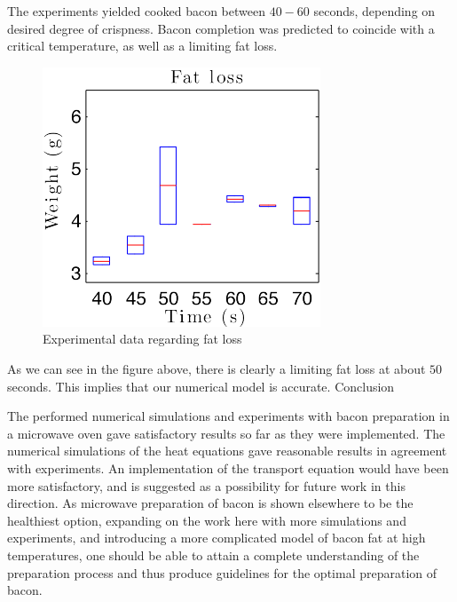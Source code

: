 \documentclass[final,hyperref={pdfpagelabels=false}]{beamer}
\begin{document}
\begin{frame}
\begin{columns}[t]
\begin{column}{.97\textwidth}
\begin{multicols}{2}
    \vspace{1.0\baselineskip}	
The experiments yielded cooked bacon between $40-60$ seconds, depending on
desired degree of crispness. Bacon completion was predicted to coincide with a
critical temperature, as well as a limiting fat loss.
\begin{figure}[!h] 
  \begin{center}
    \includegraphics[width=\linewidth]{poster_bacon.pdf}
  \end{center}
  \caption{Experimental data regarding fat loss}
  \label{fig:bacon-50sec}
\end{figure}
As we can see in the figure above, there is clearly a limiting fat loss at about
$50$ seconds. This implies that our numerical model is accurate.
\vspace{1.0\baselineskip}
{\Large Conclusion}

    The performed numerical simulations and experiments with bacon preparation
in a microwave oven gave satisfactory results so far as they were implemented.
The numerical simulations of the heat equations gave reasonable results in agreement
with experiments. An implementation of the transport equation would have been
more satisfactory, and is suggested as a possibility for future work in this
direction. As microwave preparation of bacon is shown elsewhere to be the
healthiest option, expanding on the work here with more simulations and
experiments, and introducing a more complicated model of bacon fat at high
temperatures, one should be able to attain a complete understanding of the
preparation process and thus produce guidelines for the optimal preparation of
bacon.





    \end{multicols}



  \end{column}
  \end{columns}
  \end{frame}
\end{document}
